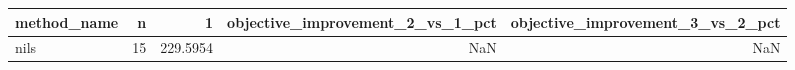 \begin{tabular}{lrrrr}
\toprule
method_name & n & 1 & objective_improvement_2_vs_1_pct & objective_improvement_3_vs_2_pct \\
\midrule
nils & 15 & 229.5954 & NaN & NaN \\
\bottomrule
\end{tabular}
